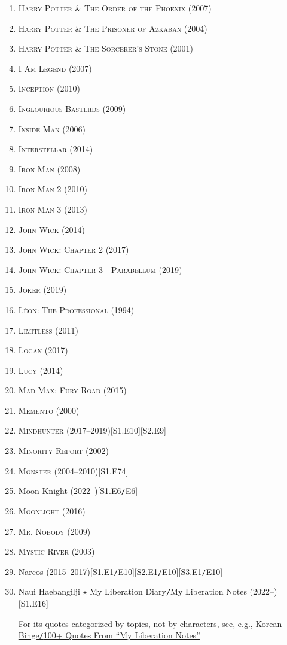 \documentclass{article}
\numberwithin{equation}{section}
\begin{document}
\begin{enumerate}
	\item \textsc{Harry Potter \& The Order of the Phoenix} (2007)
	\item \textsc{Harry Potter \& The Prisoner of Azkaban} (2004)
	\item \textsc{Harry Potter \& The Sorcerer's Stone} (2001)
	\item \textsc{I Am Legend} (2007)
	\item \textsc{Inception} (2010)
	\item \textsc{Inglourious Basterds} (2009)
	\item \textsc{Inside Man} (2006)
	\item \textsc{Interstellar} (2014)
	\item \textsc{Iron Man} (2008)
	\item \textsc{Iron Man 2} (2010)
	\item \textsc{Iron Man 3} (2013)
	\item \textsc{John Wick} (2014)
	\item \textsc{John Wick: Chapter 2} (2017)
	\item \textsc{John Wick: Chapter 3 - Parabellum} (2019)
	\item \textsc{Joker} (2019)
	\item \textsc{L\'eon: The Professional} (1994)
	\item \textsc{Limitless} (2011)
	\item \textsc{Logan} (2017)
	\item \textsc{Lucy} (2014)
	\item \textsc{Mad Max: Fury Road} (2015)
	\item \textsc{Memento} (2000)
	\item \textsc{Mindhunter} (2017--2019)\hfill[S1.E10][S2.E9]
	\item \textsc{Minority Report} (2002)
	\item \textsc{Monster} (2004--2010)\hfill[S1.E74]
	\item Moon Knight (2022--)\hfill[S1.E6\texttt{/}E6]
	\item \textsc{Moonlight} (2016)
	\item \textsc{Mr. Nobody} (2009)
	\item \textsc{Mystic River} (2003)
	\item Narcos (2015--2017)\hfill[S1.E1\texttt{/}E10][S2.E1\texttt{/}E10][S3.E1\texttt{/}E10]
	\item Naui Haebangilji $\star$ My Liberation Diary\texttt{/}My Liberation Notes (2022--)\hfill[S1.E16]
	
	For its quotes categorized by topics, not by characters, see, e.g., \href{https://korean-binge.com/2022/04/12/100-quotes-from-my-liberation-notes/}{Korean Binge\texttt{/}100+ Quotes From ``My Liberation Notes''}	
	

\end{enumerate}
\end{document}
